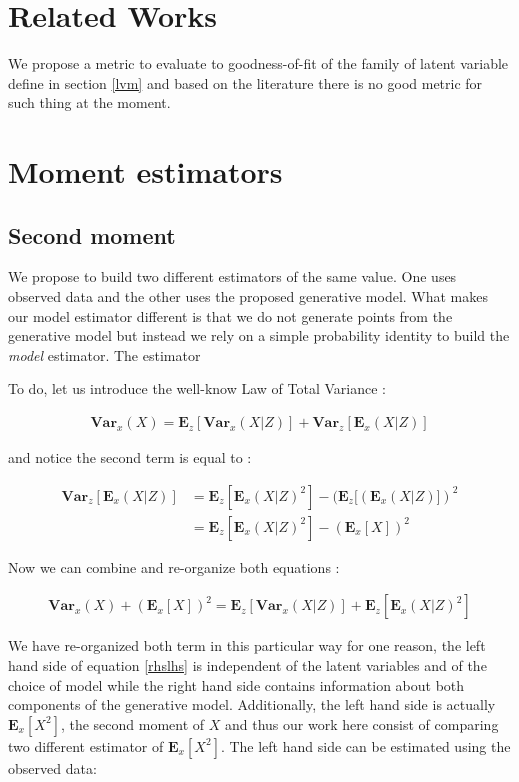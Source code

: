 \documentclass{article}
\newcommand{\Vx}{\textbf{Var}_x}
\newcommand{\Ex}{\textbf{E}_x}
\newcommand{\Vz}{\textbf{Var}_z}
\newcommand{\Ez}{\textbf{E}_z}
\begin{document}
\section{Related Works}

We propose a metric to evaluate to goodness-of-fit of the family of latent variable define in section \ref{lvm} and based on the literature there is no good metric for such thing at the moment. 

\section{Moment estimators}

\subsection{Second moment}

We propose to build two different estimators of the same value. One uses observed data and the other uses the proposed generative model. What makes our model estimator different is that we do not generate points from the generative model but instead we rely on a simple probability identity to build the \textit{model} estimator. The estimator 

\bigskip

To do, let us introduce the well-know Law of Total Variance :


\begin{align}
\Vx(X) = \Ez[\Vx(X|Z)] + \Vz[\Ex(X|Z)]
\end{align}

and notice the second term is equal to :

\begin{align}
\Vz[\Ex(X|Z)] &= \Ez[\Ex(X|Z)^2] - (\Ez[(\Ex(X|Z)])^2 \\
&= \Ez[\Ex(X|Z)^2] - (\Ex[X])^2
\end{align}

Now we can combine and re-organize both equations :

\begin{align}
\Vx(X)+ (\Ex[X])^2 = \Ez[\Vx(X|Z)] + \Ez[\Ex(X|Z)^2]
\label{rhslhs}
\end{align}

We have re-organized both term in this particular way for one reason, the left hand side of equation \ref{rhslhs} is independent of the latent variables and of the choice of model while the right hand side contains information about both components of the generative model. Additionally, the left hand side is actually $\Ex[X^2]$, the second moment of $X$ and thus our work here consist of comparing two different estimator of $\Ex[X^2]$. The left hand side can be estimated using the observed data:  
\end{document}
